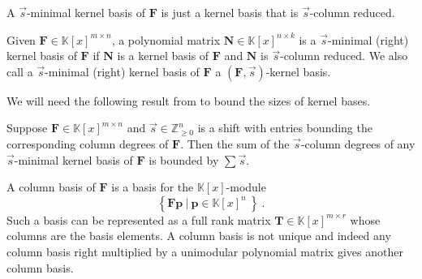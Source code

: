 A $\vec{s}$-minimal kernel basis of $\mathbf{F}$ is just a kernel
basis that is $\vec{s}$-column reduced. 
\begin{defn}
Given $\mathbf{F}\in\mathbb{K}\left[x\right]^{m\times n}$, a polynomial
matrix $\mathbf{N}\in\mathbb{K}\left[x\right]^{n\times k}$ is a $\vec{s}$-minimal
(right) kernel basis of $\mathbf{F}$ if\textbf{ $\mathbf{N}$} is
a kernel basis of $\mathbf{F}$ and $\mathbf{N}$ is $\vec{s}$-column
reduced. We also call a $\vec{s}$-minimal (right) kernel basis of
$\mathbf{F}$ a $\left(\mathbf{F},\vec{s}\right)$-kernel basis.


\end{defn}




We will need the following result from \citep{za2012} to bound the
sizes of kernel bases.
\begin{thm}
\label{thm:boundOfSumOfShiftedDegreesOfKernelBasis}Suppose $\mathbf{F}\in\mathbb{K}\left[x\right]^{m\times n}$
and $\vec{s}\in\mathbb{Z}_{\ge0}^{n}$ is a shift with entries bounding
the corresponding column degrees of $\mathbf{F}$. Then the sum of
the $\vec{s}$-column degrees of any $\vec{s}$-minimal kernel basis
of $\mathbf{F}$ is bounded by $\sum\vec{s}$. 
\end{thm}
A column basis of $\mathbf{F}$ is a basis for the $\mathbb{K}\left[x\right]$-module
\[
\left\{ \mathbf{F}\mathbf{p}~|~\mathbf{p}\in\mathbb{K}\left[x\right]^{n}~\right\} ~.
\]
 Such a basis can be represented as a full rank matrix $\mathbf{T}\in\mathbb{K}\left[x\right]^{m\times r}$
whose columns are the basis elements. A column basis is not unique
and indeed any column basis right multiplied by a unimodular polynomial
matrix gives another column basis.

